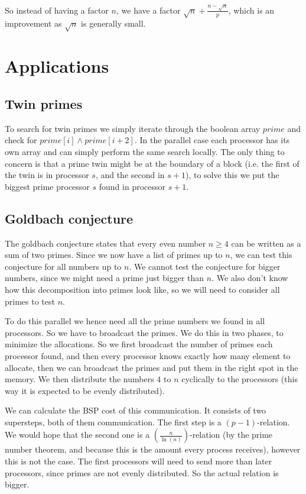 \documentclass{article}
\begin{document}
So instead of having a factor $n$, we have a factor $\sqrt{n} + \frac{n-\sqrt{n}}{p}$, which is an improvement as $\sqrt{n}$ is generally small.

\section{Applications}
\subsection{Twin primes}
\label{sec:twinprimes}
To search for twin primes we simply iterate through the boolean array $prime$ and check for $prime[i] \wedge prime[i+2]$. In the parallel case each processor has its own array and can simply perform the same search locally. The only thing to concern is that a prime twin might be at the boundary of a block (i.e. the first of the twin is in processor $s$, and the second in $s+1$), to solve this we put the biggest prime processor $s$ found in processor $s+1$.

\subsection{Goldbach conjecture}
\label{sec:goldbach}
The goldbach conjecture states that every even number $n \geq 4$ can be written as a sum of two primes. Since we now have a list of primes up to $n$, we can test this conjecture for all numbers up to $n$. We cannot test the conjecture for bigger numbers, since we might need a prime just bigger than $n$. We also don't know how this decomposition into primes look like, so we will need to consider all primes to test $n$.

To do this parallel we hence need all the prime numbers we found in all processors. So we have to broadcast the primes. We do this in two phases, to minimize the allocations. So we first broadcast the number of primes each processor found, and then every processor knows exactly how many element to allocate, then we can broadcast the primes and put them in the right spot in the memory. We then distribute the numbers $4$ to $n$ cyclically to the processors (this way it is expected to be evenly distributed).

We can calculate the BSP cost of this communication. It consists of two supersteps, both of them communication. The first step is a $(p-1)$-relation. We would hope that the second one is a $(\frac{n}{\ln(n)})$-relation (by the prime number theorem, and because this is the amount every process receives), however this is not the case. The first processors will need to send more than later processors, since primes are not evenly distributed. So the actual relation is bigger.
\end{document}

